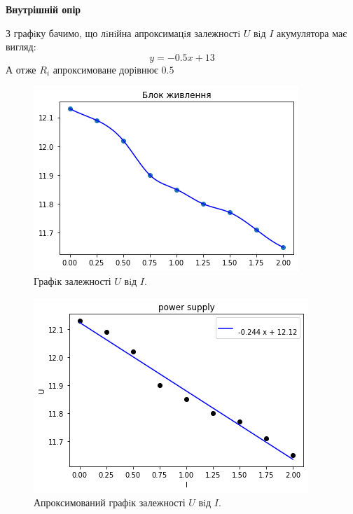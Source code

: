 \documentclass[a4paper,12pt]{article}
\newcommand{\ri}{R_i}
\begin{document}
	\begin{flushleft}
		\textbf{Внутрішній опір}
	\end{flushleft}
	З графiку бачимо, що лiнiйна апроксимацiя залежностi $U$ вiд $I$ акумулятора має вигляд:\\ $$y=-0.5x+13$$
	А отже $\ri$ апроксимоване дорiвнює $0.5$
	
	
\newpage
	\begin{figure}[h]
		\centering
		\begin{minipage}[h]{0.5\linewidth}
			\includegraphics[width=1\linewidth]{Prt sc/Figure_3_1.jpeg} \caption{Графiк залежності $U$ вiд $I$.} 
		\end{minipage}
	\end{figure}
	\begin{figure}[h]
		\centering
		\begin{minipage}[h]{0.5\linewidth}
			\includegraphics[width=1\linewidth]{Prt sc/Figure_3_2.jpeg}
		\end{minipage}
		\caption{Апроксимований графiк залежності $U$ вiд $I$.}
	\end{figure}
	
\end{document}
